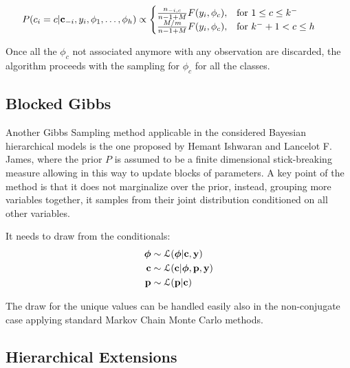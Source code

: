 \begin{displaymath}
		            	\hspace{-20pt}
		            	P(c_{i}=c | \mathbf c_{-i}, y_{i}, \phi_{1},\dots,\phi_{h}) \propto \begin{cases}  \frac{n_{-i,c}}{n-1+M}F(y_{i},\phi_{c}), & \mbox{for } 1 \leq c \leq k^{-} \\ \frac{M/m}{n-1+M}F(y_{i},\phi_{c}), & \mbox{for } k^{-}+1 < c \leq h
		            	\end{cases}
		            	\vspace{-5pt}
		            	\end{displaymath}

Once all the $\phi_c$ not associated anymore with any observation are discarded, the algorithm proceeds with the sampling for $\phi_c$ for all the classes.


\subsection{Blocked Gibbs}
Another Gibbs Sampling method applicable in the considered Bayesian hierarchical models is the one proposed by Hemant Ishwaran and Lancelot F. James, where the prior $P$ is assumed to be a finite dimensional stick-breaking measure allowing in this way to update blocks of parameters. A key point of the method is that it does not marginalize over the prior, instead, grouping more variables together, it samples from their joint distribution conditioned on all other variables. 

It needs to draw from the conditionals:
	\begin{align*}
			\boldsymbol\phi &\sim \mathcal L(\boldsymbol\phi | \mathbf{c}, \mathbf{y}) \\
			\mathbf{c} &\sim \mathcal L (\mathbf{c}| \boldsymbol\phi,\mathbf{p}, \mathbf{y}) \\
			\mathbf{p} &\sim \mathcal L (\mathbf{p}| \mathbf{c})
		\end{align*}

The draw for the unique values can be handled easily also in the non-conjugate case applying standard Markov Chain Monte Carlo methods.



\subsection{Hierarchical Extensions}
